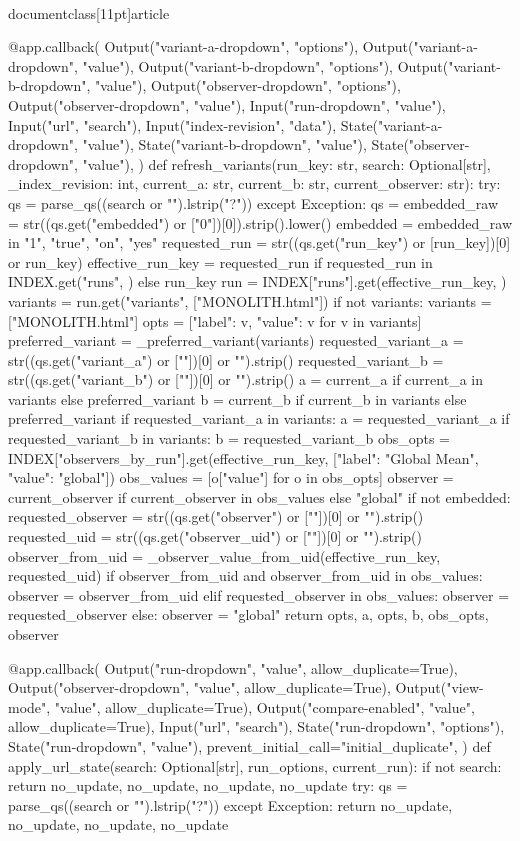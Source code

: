 \\documentclass[11pt]{article}
\begin{document}
\begin{CodeBlock}
{{{{{{{{@app.callback(
    Output("variant-a-dropdown", "options"),
    Output("variant-a-dropdown", "value"),
    Output("variant-b-dropdown", "options"),
    Output("variant-b-dropdown", "value"),
    Output("observer-dropdown", "options"),
    Output("observer-dropdown", "value"),
    Input("run-dropdown", "value"),
    Input("url", "search"),
    Input("index-revision", "data"),
    State("variant-a-dropdown", "value"),
    State("variant-b-dropdown", "value"),
    State("observer-dropdown", "value"),
)
def refresh_variants(run_key: str, search: Optional[str], _index_revision: int, current_a: str, current_b: str, current_observer: str):
    try:
        qs = parse_qs((search or "").lstrip("?"))
    except Exception:
        qs = {}
    embedded_raw = str((qs.get("embedded") or ["0"])[0]).strip().lower()
    embedded = embedded_raw in {"1", "true", "on", "yes"}
    requested_run = str((qs.get("run_key") or [run_key])[0] or run_key)
    effective_run_key = requested_run if requested_run in INDEX.get("runs", {}) else run_key
    run = INDEX["runs"].get(effective_run_key, {})
    variants = run.get("variants", ["MONOLITH.html"])
    if not variants:
        variants = ["MONOLITH.html"]
    opts = [{"label": v, "value": v} for v in variants]
    preferred_variant = _preferred_variant(variants)
    requested_variant_a = str((qs.get("variant_a") or [""])[0] or "").strip()
    requested_variant_b = str((qs.get("variant_b") or [""])[0] or "").strip()
    a = current_a if current_a in variants else preferred_variant
    b = current_b if current_b in variants else preferred_variant
    if requested_variant_a in variants:
        a = requested_variant_a
    if requested_variant_b in variants:
        b = requested_variant_b
    obs_opts = INDEX["observers_by_run"].get(effective_run_key, [{"label": "Global Mean", "value": "global"}])
    obs_values = [o["value"] for o in obs_opts]
    observer = current_observer if current_observer in obs_values else "global"
    if not embedded:
        requested_observer = str((qs.get("observer") or [""])[0] or "").strip()
        requested_uid = str((qs.get("observer_uid") or [""])[0] or "").strip()
        observer_from_uid = _observer_value_from_uid(effective_run_key, requested_uid)
        if observer_from_uid and observer_from_uid in obs_values:
            observer = observer_from_uid
        elif requested_observer in obs_values:
            observer = requested_observer
    else:
        observer = "global"
    return opts, a, opts, b, obs_opts, observer


@app.callback(
    Output("run-dropdown", "value", allow_duplicate=True),
    Output("observer-dropdown", "value", allow_duplicate=True),
    Output("view-mode", "value", allow_duplicate=True),
    Output("compare-enabled", "value", allow_duplicate=True),
    Input("url", "search"),
    State("run-dropdown", "options"),
    State("run-dropdown", "value"),
    prevent_initial_call="initial_duplicate",
)
def apply_url_state(search: Optional[str], run_options, current_run):
    if not search:
        return no_update, no_update, no_update, no_update
    try:
        qs = parse_qs((search or "").lstrip("?"))
    except Exception:
        return no_update, no_update, no_update, no_update

}}}}}}}}
\end{CodeBlock}
\end{document}
